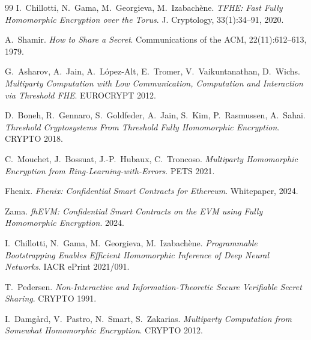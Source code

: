 \documentclass[11pt,a4paper]{article}
\begin{document}
\begin{thebibliography}{99}
I.~Chillotti, N.~Gama, M.~Georgieva, M.~Izabach\`{e}ne.
\emph{TFHE: Fast Fully Homomorphic Encryption over the Torus}.
J. Cryptology, 33(1):34--91, 2020.

A.~Shamir.
\emph{How to Share a Secret}.
Communications of the ACM, 22(11):612--613, 1979.

G.~Asharov, A.~Jain, A.~L\'{o}pez-Alt, E.~Tromer, V.~Vaikuntanathan, D.~Wichs.
\emph{Multiparty Computation with Low Communication, Computation and Interaction via Threshold FHE}.
EUROCRYPT 2012.

D.~Boneh, R.~Gennaro, S.~Goldfeder, A.~Jain, S.~Kim, P.~Rasmussen, A.~Sahai.
\emph{Threshold Cryptosystems From Threshold Fully Homomorphic Encryption}.
CRYPTO 2018.

C.~Mouchet, J.~Bossuat, J.-P.~Hubaux, C.~Troncoso.
\emph{Multiparty Homomorphic Encryption from Ring-Learning-with-Errors}.
PETS 2021.

Fhenix.
\emph{Fhenix: Confidential Smart Contracts for Ethereum}.
Whitepaper, 2024.

Zama.
\emph{fhEVM: Confidential Smart Contracts on the EVM using Fully Homomorphic Encryption}.
2024.

I.~Chillotti, N.~Gama, M.~Georgieva, M.~Izabach\`{e}ne.
\emph{Programmable Bootstrapping Enables Efficient Homomorphic Inference of Deep Neural Networks}.
IACR ePrint 2021/091.

T.~Pedersen.
\emph{Non-Interactive and Information-Theoretic Secure Verifiable Secret Sharing}.
CRYPTO 1991.

I.~Damg\r{a}rd, V.~Pastro, N.~Smart, S.~Zakarias.
\emph{Multiparty Computation from Somewhat Homomorphic Encryption}.
CRYPTO 2012.
\end{thebibliography}
\end{document}
